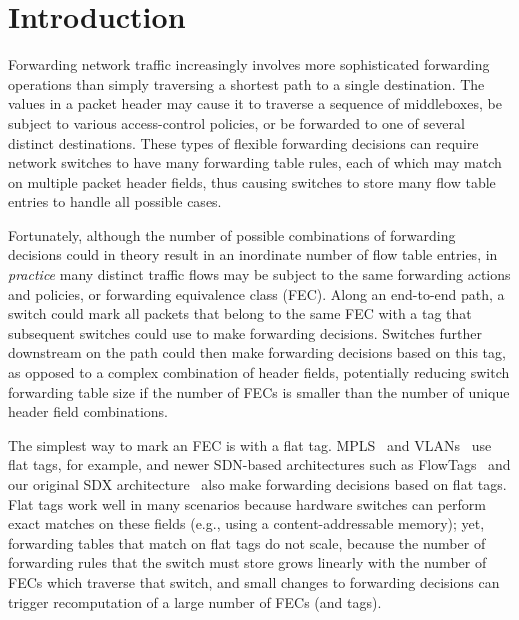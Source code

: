 \section{Introduction}
\label{sec:intro}

Forwarding network traffic increasingly involves more sophisticated
forwarding operations than simply traversing a shortest path to a single
destination.  The values in a packet header may cause it to traverse a
sequence of middleboxes, be subject to various access-control policies,
or be forwarded to one of several distinct destinations. These types of
flexible forwarding decisions can require network switches to have many
forwarding table rules, each of which may match on multiple packet
header fields, thus causing switches to store many flow table entries to
handle all possible cases. 

Fortunately, although the number of possible
combinations of forwarding decisions could in theory result in an
inordinate number of flow table entries, in {\em practice} many distinct
traffic flows may be subject to the same forwarding actions and
policies, or {forwarding equivalence class} (FEC). Along an end-to-end
path, a switch could mark all packets that belong to the same FEC with a
tag that subsequent switches could use to make forwarding
decisions. Switches further downstream on the path could then make
forwarding decisions based on this tag, as opposed to a complex
combination of header fields, potentially reducing switch forwarding
table size if the number of FECs is smaller than the number of unique
header field combinations.

The simplest way to mark an FEC is with a flat tag.  MPLS~\cite{mpls}
and VLANs~\cite{vlan} use flat tags, for example, and newer SDN-based
architectures such as FlowTags~\cite{flowtags} and our original SDX
architecture~\cite{sdx} also make forwarding decisions based on flat
tags.  Flat tags work well in many scenarios because hardware switches
can perform exact matches on these fields (e.g., using a
content-addressable memory); yet, forwarding tables that match on flat
tags do not scale, because the number of forwarding rules that the
switch must store grows linearly with the number of FECs which
traverse that switch, and small changes to forwarding decisions can
trigger recomputation of a large number of FECs (and tags).

